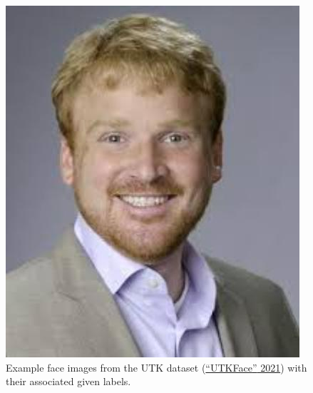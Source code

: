 \documentclass[
  letterpaper,
  DIV=11,
  numbers=noendperiod]{scrreprt}
\begin{document}
\begin{figure}
\begin{minipage}[t]{0.33\linewidth}
{{\includegraphics{images/utk_imgs/38_0_0_20170105172756958.jpg}

}

}

\end{minipage}%
%
\begin{minipage}[t]{0.33\linewidth}

{\centering 


}

\end{minipage}%

\caption{\label{fig-faces}Example face images from the UTK dataset
(\protect\hyperlink{ref-utkDataset}{{``{UTKFace}''} 2021}) with their
associated given labels.}

\end{figure}
\end{document}
